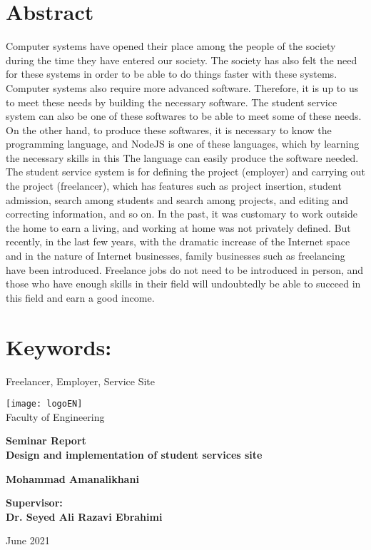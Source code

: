
\thispagestyle{empty}

\begin{LTR}
\begin{flushleft}

\section*{Abstract}
Computer systems have opened their place among the people of the society during the time they have entered our society.
The society has also felt the need for these systems in order to be able to do things faster with these systems.
Computer systems also require more advanced software.
Therefore, it is up to us to meet these needs by building the necessary software.
The student service system can also be one of these softwares to be able to meet some of these needs.
On the other hand, to produce these softwares, it is necessary to know the programming language, and NodeJS is one of these languages, which by learning the necessary skills in this The language can easily produce the software needed.
The student service system is for defining the project (employer) and carrying out the project (freelancer), which has features such as project insertion, student admission, search among students and search among projects, and editing and correcting information, and so on.
In the past, it was customary to work outside the home to earn a living, and working at home was not privately defined.
But recently, in the last few years, with the dramatic increase of the Internet space and in the nature of Internet businesses, family businesses such as freelancing have been introduced.
Freelance jobs do not need to be introduced in person, and those who have enough skills in their field will undoubtedly be able to succeed in this field and earn a good income.
\section*{Keywords:}
Freelancer, Employer, Service Site

\clearpage
	
\begin{titlepage}
	
	\centering
	\texttt{[image: logoEN]}
	\\[10pt]
	{\Large
		Faculty of Engineering
	‬‫‬‬}

	\vfill
	{\Large \bfseries 
		Seminar Report
	} \\[10pt]
	{\huge	\bfseries
		Design and implementation of student services site
	}

	\vfill
	{\large \bfseries
	Mohammad Amanalikhani
	}

	\vfill
	{\large \bfseries
		Supervisor:
		\\[10pt]
		Dr. Seyed Ali Razavi Ebrahimi
	}

	\vfill
	{\large 
		June 2021
	}
	
	
\end{titlepage}

\end{flushleft}
\end{LTR}
\clearpage






 
 
 